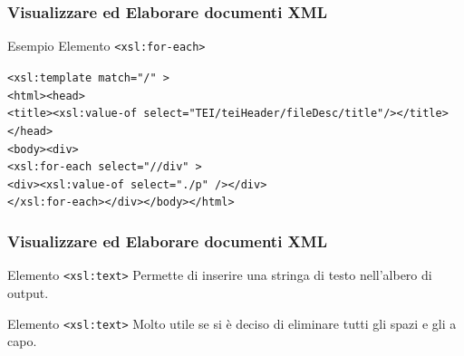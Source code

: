 \begin{frame}
    \frametitle{Visualizzare ed Elaborare documenti XML}
    \addtocounter{nframe}{1}
    

     \begin{block}{Esempio Elemento \texttt{<xsl:for-each>}}
        
        \texttt{<xsl:template match="/" >}
        \\\texttt{<html><head>}
        \\\texttt{<title><xsl:value-of select="TEI/teiHeader/fileDesc/title"/></title></head>}
        \\\texttt{<body><div>}
        \\\texttt{<xsl:for-each select="//div" >}
        \\\texttt{<div><xsl:value-of select="./p" /></div>}
        \\\texttt{</xsl:for-each></div></body></html>}
     \end{block}
    
\end{frame}




\begin{frame}
    \frametitle{Visualizzare ed Elaborare documenti XML}
    \addtocounter{nframe}{1}
    

     \begin{block}{Elemento \texttt{<xsl:text>}}
        Permette di inserire una stringa di testo nell’albero di output.
     \end{block}

     \begin{block}{Elemento \texttt{<xsl:text>}}
        Molto utile se si è deciso di eliminare tutti gli spazi e gli a capo.
     \end{block}
     

\end{frame}

